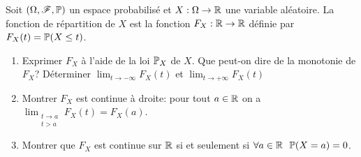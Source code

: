 \begin{td-exo} %
    Soit \((\Omega,\mathscr{F},\mathbb{P})\) un espace probabilisé et \(X:\Omega\to\mathbb{R}\) une variable aléatoire. La fonction de répartition de \(X\) est la fonction \(F_X:\mathbb{R}\to\mathbb{R}\) définie par \(F_X(t)=\mathbb{P}(X\le t)\).
    
    \begin{enumerate}
        \item Exprimer \(F_X\) à l'aide de la loi \(\mathbb{P}_X\) de \(X\). Que peut-on dire de la monotonie de \(F_X\)? Déterminer \(\displaystyle\lim_{t\to-\infty}F_X(t)\) et \(\displaystyle\lim_{t\to+\infty}F_X(t)\)
        
        \item Montrer \(F_X\) est continue à droite: pour tout \(a\in\mathbb{R}\) on a
        \(\displaystyle \lim_{\substack{t\to a \\ t>a}}F_X(t)=F_X(a)\).
        \item Montrer que \(F_X\) est continue sur \(\mathbb{R}\) si et seulement si \(\forall a\in\mathbb{R}\ \ \mathbb{P}(X=a)=0\).
    \end{enumerate}
\end{td-exo}
